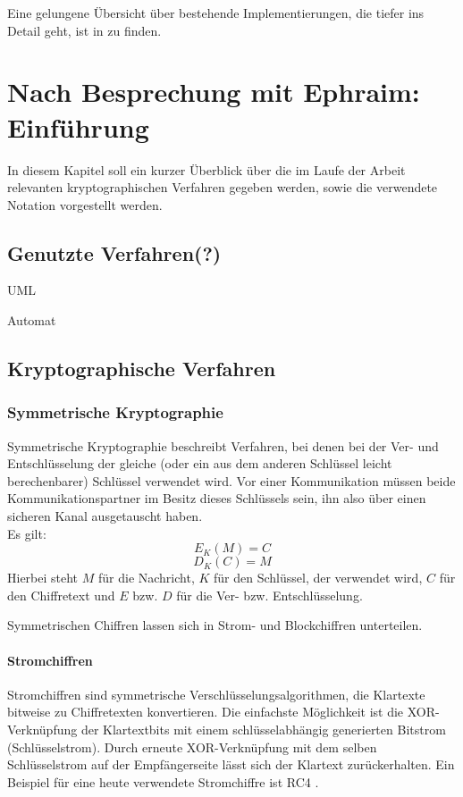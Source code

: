 Eine gelungene Übersicht über bestehende Implementierungen, die tiefer ins Detail geht, ist in \cite{meyer14} zu finden.

\chapter{Nach Besprechung mit Ephraim: Einführung}

In diesem Kapitel soll ein kurzer Überblick über die im Laufe der Arbeit relevanten kryptographischen Verfahren gegeben werden, sowie die verwendete Notation vorgestellt werden.

\section{Genutzte Verfahren(?)}

UML

Automat



\section{Kryptographische Verfahren}


\subsection{Symmetrische Kryptographie}

Symmetrische Kryptographie beschreibt Verfahren, bei denen bei der Ver- und Entschlüsselung der gleiche (oder ein aus dem anderen Schlüssel leicht berechenbarer) Schlüssel verwendet wird. Vor einer Kommunikation müssen beide Kommunikationspartner im Besitz dieses Schlüssels sein, ihn also über einen sicheren Kanal ausgetauscht haben.\\
Es gilt:
\[E_K(M)=C\] 
\[D_K(C)=M\] 
Hierbei steht \(M\) für die Nachricht, \(K\) für den Schlüssel, der verwendet wird, \(C\) für den Chiffretext und \(E\) bzw. \(D\) für die Ver- bzw. Entschlüsselung.

Symmetrischen Chiffren lassen sich in Strom- und Blockchiffren unterteilen.

\subsubsection{Stromchiffren}

Stromchiffren sind symmetrische Verschlüsselungsalgorithmen, die Klartexte bitweise zu Chiffretexten konvertieren. Die einfachste Möglichkeit ist die XOR-Verknüpfung der Klartextbits mit einem schlüsselabhängig generierten Bitstrom (Schlüsselstrom). Durch erneute XOR-Verknüpfung mit dem selben Schlüsselstrom auf der Empfängerseite lässt sich der Klartext zurückerhalten. Ein Beispiel für eine heute verwendete Stromchiffre ist RC4 \cite{Schneier2006}.

